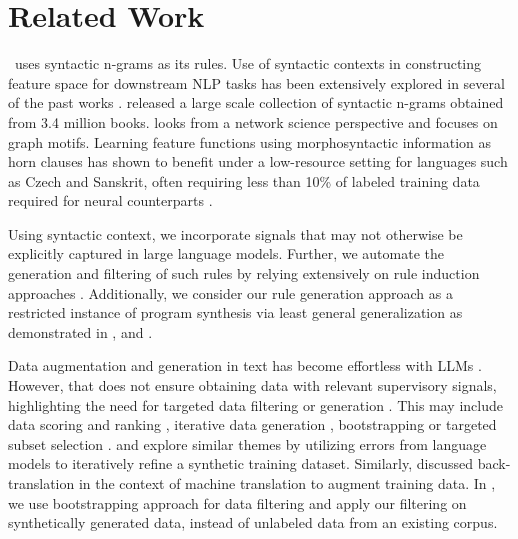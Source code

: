 \section{Related Work}
\our~uses syntactic n-grams as its rules. Use of syntactic contexts in constructing feature space for downstream NLP tasks has been extensively explored in several of the past works \cite{liang-etal-2011-learning, goldberg-orwant-2013-dataset,biemann2016network}. \citet{goldberg-orwant-2013-dataset} released a large scale collection of syntactic n-grams obtained from 3.4 million books. \citet{biemann2016network} looks from a network science perspective and focuses on graph motifs. Learning feature functions using morphosyntactic information as horn clauses has shown to benefit under a low-resource setting for languages such as Czech and Sanskrit, often requiring less than 10\% of labeled training data required for neural counterparts \cite{10.1162/coli_a_00390,krishna-etal-2018-free}. 

Using syntactic context, we incorporate signals that may not otherwise be explicitly captured in large language models. Further, we automate the generation and filtering of such rules by relying extensively on rule induction approaches \cite{varma2018snuba,bajpai-etal-2024-fair,lao2010relational}. Additionally, we consider our rule generation approach as a restricted instance of program synthesis via least general generalization as demonstrated in \citet{Raza_Gulwani_Milic-Frayling_2014}, and \citet{thakoor2018multisynthesis}.

Data augmentation and generation in text has become effortless with LLMs \cite{ding2024data}. However, that does not ensure obtaining data with relevant supervisory signals, highlighting the need for targeted data filtering or generation \cite{pmlr-v139-killamsetty21a,mirzasoleiman2020coresets}. This may include data scoring and ranking \cite{lin-etal-2023-selective}, iterative data generation \cite{rao-etal-2023-makes}, bootstrapping \cite{varma2018snuba} or targeted subset selection \cite{pmlr-v37-wei15}. \citet{wang-etal-2023-lets} and \citet{lee-etal-2024-llm2llm} explore similar themes by utilizing errors from language models to iteratively refine a synthetic training dataset. Similarly, \cite{hoang-etal-2018-iterative} discussed back-translation in the context of machine translation to augment training data. In \our, we use bootstrapping approach for data filtering and apply our filtering on synthetically generated data, instead of unlabeled data from an existing corpus.